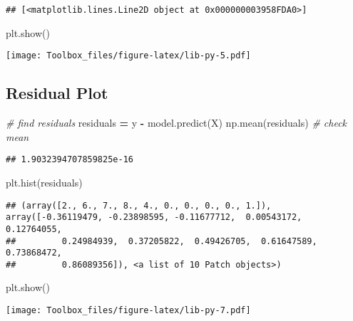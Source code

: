\documentclass[
]{book}
\newenvironment{Shaded}{\begin{snugshade}}{\end{snugshade}}
\newcommand{\CommentTok}[1]{\textcolor[rgb]{0.56,0.35,0.01}{\textit{#1}}}
\newcommand{\NormalTok}[1]{#1}
\newcommand{\OperatorTok}[1]{\textcolor[rgb]{0.81,0.36,0.00}{\textbf{#1}}}
\begin{document}
\begin{verbatim}
## [<matplotlib.lines.Line2D object at 0x000000003958FDA0>]
\end{verbatim}

\begin{Shaded}
\begin{Highlighting}[]
\NormalTok{plt.show()}
\end{Highlighting}
\end{Shaded}

\texttt{[image: Toolbox\_files/figure-latex/lib-py-5.pdf]}

\hypertarget{residual-plot}{%
\subsection{Residual Plot}\label{residual-plot}}

\begin{Shaded}
\begin{Highlighting}[]
\CommentTok{\# find residuals}
\NormalTok{residuals }\OperatorTok{=}\NormalTok{ y }\OperatorTok{{-}}\NormalTok{ model.predict(X)}
\NormalTok{np.mean(residuals) }\CommentTok{\# check mean}
\end{Highlighting}
\end{Shaded}

\begin{verbatim}
## 1.9032394707859825e-16
\end{verbatim}

\begin{Shaded}
\begin{Highlighting}[]
\NormalTok{plt.hist(residuals)}
\end{Highlighting}
\end{Shaded}

\begin{verbatim}
## (array([2., 6., 7., 8., 4., 0., 0., 0., 0., 1.]), array([-0.36119479, -0.23898595, -0.11677712,  0.00543172,  0.12764055,
##         0.24984939,  0.37205822,  0.49426705,  0.61647589,  0.73868472,
##         0.86089356]), <a list of 10 Patch objects>)
\end{verbatim}

\begin{Shaded}
\begin{Highlighting}[]
\NormalTok{plt.show()}
\end{Highlighting}
\end{Shaded}

\texttt{[image: Toolbox\_files/figure-latex/lib-py-7.pdf]}
\end{document}
